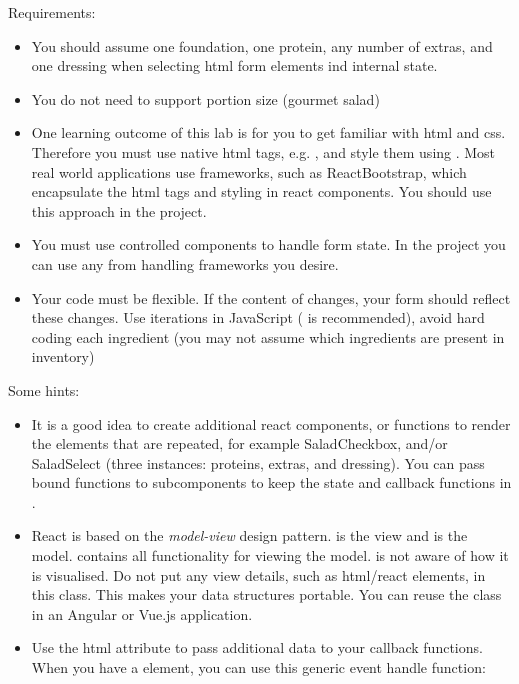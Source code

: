 \documentclass[fleqn, article, a4paper]{memoir}
\begin{document}
\begin{Assignments}
\noindent Requirements:
\begin{itemize}
  \item You should assume one foundation, one protein, any number of extras, and one dressing when selecting html form elements ind internal state.
  \item You do not need to support portion size (gourmet salad)
  \item One learning outcome of this lab is for you to get familiar with html and css. Therefore you must use native html tags, e.g. , and style them using . Most real world applications use frameworks, such as ReactBootstrap, which encapsulate the html tags and styling in react components. You should use this approach in the project.
  \item You must use controlled components to handle form state. In the project you can use any from handling frameworks you desire.
  \item Your code must be flexible. If the content of  changes, your form should reflect these changes. Use iterations in JavaScript ( is recommended), avoid hard coding each ingredient (you may not assume which ingredients are present in inventory)
\end{itemize}
\noindent Some hints:
\begin{itemize}
  \item It is a good idea to create additional react components, or functions to render the elements that are repeated, for example SaladCheckbox, and/or SaladSelect (three instances: proteins, extras, and dressing). You can pass bound functions to subcomponents to keep the state and callback functions in .
  \item React is based on the \emph{model-view} design pattern.  is the view and  is the model.  contains all functionality for viewing the model.  is not aware of how it is visualised. Do not put any view details, such as html/react elements, in this class. This makes your data structures portable. You can reuse the  class in an Angular or Vue.js application.
  \item Use the html  attribute to pass additional data to your callback functions. When you have a  element, you can use this generic event handle function:
\begin{Code}

\end{Code}
\end{itemize}
\end{Assignments}
\end{document}

